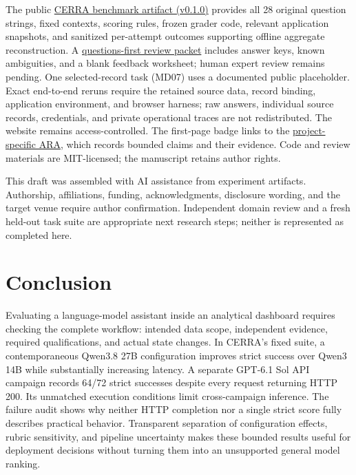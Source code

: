 \documentclass[10pt,twocolumn,letterpaper]{article}
\begin{document}
The public \href{https://github.com/cnpcshangbo/ara-cerra-assistant-benchmark/tree/v0.1.0}{CERRA benchmark artifact (v0.1.0)} provides all 28 original question strings, fixed contexts, scoring rules, frozen grader code, relevant application snapshots, and sanitized per-attempt outcomes supporting offline aggregate reconstruction. A \href{https://github.com/cnpcshangbo/ara-cerra-assistant-benchmark/blob/v0.1.0/review/README.md}{questions-first review packet} includes answer keys, known ambiguities, and a blank feedback worksheet; human expert review remains pending. One selected-record task (MD07) uses a documented public placeholder. Exact end-to-end reruns require the retained source data, record binding, application environment, and browser harness; raw answers, individual source records, credentials, and private operational traces are not redistributed. The website remains access-controlled. The first-page badge links to the \href{https://www.agenticresearch.sh/ara/cnpcshangbo/ara-cerra-assistant-benchmark}{project-specific ARA}, which records bounded claims and their evidence. Code and review materials are MIT-licensed; the manuscript retains author rights.

This draft was assembled with AI assistance from experiment artifacts. Authorship, affiliations, funding, acknowledgments, disclosure wording, and the target venue require author confirmation. Independent domain review and a fresh held-out task suite are appropriate next research steps; neither is represented as completed here.

\section{Conclusion}
Evaluating a language-model assistant inside an analytical dashboard requires checking the complete workflow: intended data scope, independent evidence, required qualifications, and actual state changes. In CERRA's fixed suite, a contemporaneous Qwen3.8 27B configuration improves strict success over Qwen3 14B while substantially increasing latency. A separate GPT-6.1 Sol API campaign records 64/72 strict successes despite every request returning HTTP 200. Its unmatched execution conditions limit cross-campaign inference. The failure audit shows why neither HTTP completion nor a single strict score fully describes practical behavior. Transparent separation of configuration effects, rubric sensitivity, and pipeline uncertainty makes these bounded results useful for deployment decisions without turning them into an unsupported general model ranking.
\end{document}
